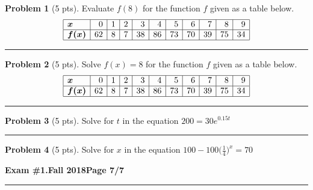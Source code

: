 \documentclass[12pt]{article}
\theoremstyle{definition}
\newtheorem{problem}{Problem}
\begin{document}
\begin{problem}[5 pts]
  Evaluate $f(8)$ for the function $f$ given as a table below.
  \begin{equation*}
    \begin{array}{|l|r|r|r|r|r|r|r|r|r|r|}
      \hline
      \boldsymbol{x} & 0 & 1 & 2 & 3 & 4 & 5 & 6 & 7 & 8 & 9 \\ \hline
      \boldsymbol{f(x)} & 62 & 8 & 7 & 38 & 86 & 73 & 70 & 39 & 75 & 34 \\ \hline
    \end{array}
  \end{equation*}

  \vspace{1cm}
\end{problem}
\hrule

\begin{problem}[5 pts]
  Solve $f(x)=8$ for the function $f$ given as a table below.
  \begin{equation*}
    \begin{array}{|l|r|r|r|r|r|r|r|r|r|r|}
      \hline
      \boldsymbol{x} & 0 & 1 & 2 & 3 & 4 & 5 & 6 & 7 & 8 & 9 \\ \hline
      \boldsymbol{f(x)} & 62 & 8 & 7 & 38 & 86 & 73 & 70 & 39 & 75 & 34 \\ \hline
    \end{array}
  \end{equation*}

  \vspace{1cm}
\end{problem}
\hrule

\begin{problem}[5 pts]
  Solve for $t$ in the equation $200 = 30e^{0.15t}$

  \vspace{4cm}
\end{problem}
\hrule

\begin{problem}[5 pts]
  Solve for $x$ in the equation $100-100\big( \tfrac{1}{4} \big)^x = 70$

\end{problem}


\newpage 


\hfill{\large\bf Exam \#1.}\hfill{\large\bf  Fall 2018}\hfill{\large\bf Page 7/7}\hrule

\bigskip
\end{document}
